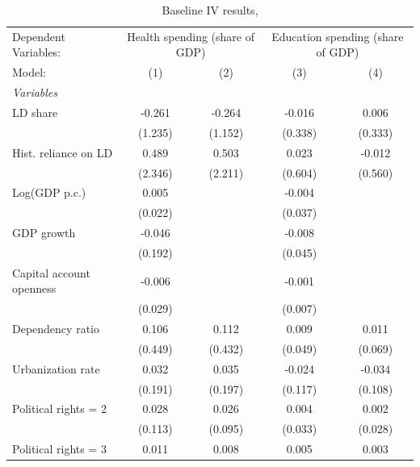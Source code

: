
\begin{table}[htbp]
   \caption{\label{tab:results_baseline_iv_overall_} Baseline IV results,}
   \centering
   \begin{tabular}{lcccc}
      \tabularnewline \midrule \midrule
      Dependent Variables: & \multicolumn{2}{c}{Health spending (share of GDP)} & \multicolumn{2}{c}{Education spending (share of GDP)}\\
      Model:                     & (1)      & (2)      & (3)      & (4)\\  
      \midrule
      \emph{Variables}\\
      LD share                   & -0.261   & -0.264   & -0.016   & 0.006\\   
                                 & (1.235)  & (1.152)  & (0.338)  & (0.333)\\   
      Hist. reliance on LD       & 0.489    & 0.503    & 0.023    & -0.012\\   
                                 & (2.346)  & (2.211)  & (0.604)  & (0.560)\\   
      Log(GDP p.c.)              & 0.005    &          & -0.004   &   \\   
                                 & (0.022)  &          & (0.037)  &   \\   
      GDP growth                 & -0.046   &          & -0.008   &   \\   
                                 & (0.192)  &          & (0.045)  &   \\   
      Capital account openness   & -0.006   &          & -0.001   &   \\   
                                 & (0.029)  &          & (0.007)  &   \\   
      Dependency ratio           & 0.106    & 0.112    & 0.009    & 0.011\\   
                                 & (0.449)  & (0.432)  & (0.049)  & (0.069)\\   
      Urbanization rate          & 0.032    & 0.035    & -0.024   & -0.034\\   
                                 & (0.191)  & (0.197)  & (0.117)  & (0.108)\\   
      Political rights = 2       & 0.028    & 0.026    & 0.004    & 0.002\\   
                                 & (0.113)  & (0.095)  & (0.033)  & (0.028)\\   
      Political rights = 3       & 0.011    & 0.008    & 0.005    & 0.003\\   

\end{tabular}
\end{table}
